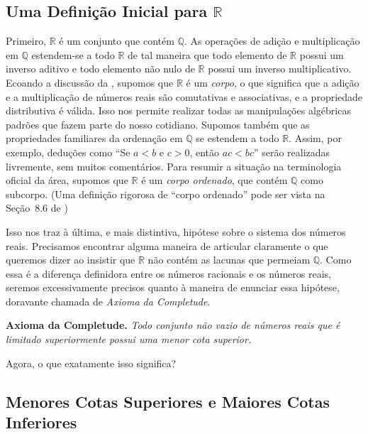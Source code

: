 \subsection{Uma Definição Inicial para $\mathbb{R}$}\label{subsec:definicao-inicial-R}

Primeiro, $\mathbb{R}$ é um conjunto que contém $\mathbb{Q}$. As operações de adição e multiplicação em $\mathbb{Q}$ estendem-se a todo $\mathbb{R}$ de tal maneira que todo elemento de $\mathbb{R}$ possui um inverso aditivo e todo elemento não nulo de $\mathbb{R}$ possui um inverso multiplicativo. Ecoando a discussão da , supomos que $\mathbb{R}$ é um \textit{corpo}, o que significa que a adição e a multiplicação de números reais são comutativas e associativas, e a propriedade distributiva é válida. Isso nos permite realizar todas as manipulações algébricas padrões que fazem parte do nosso cotidiano. Supomos também que as propriedades familiares da ordenação em $\mathbb{Q}$ se estendem a todo $\mathbb{R}$. Assim, por exemplo, deduções como ``Se $a < b$ e $c > 0$, então $ac < bc$'' serão realizadas livremente, sem muitos comentários. Para resumir a situação na terminologia oficial da área, supomos que $\mathbb{R}$ é um \textit{corpo ordenado}, que contém $\mathbb{Q}$ como subcorpo. (Uma definição rigorosa de ``corpo ordenado'' 
pode ser vista na Seção~8.6 de \cite{MR3331079})  

Isso nos traz à última, e mais distintiva, hipótese sobre o sistema dos números reais. Precisamos encontrar alguma maneira de articular claramente o que queremos dizer ao insistir que $\mathbb{R}$ não contém as lacunas que permeiam $\mathbb{Q}$. Como essa é a diferença definidora entre os números racionais e os números reais, seremos excessivamente precisos quanto à maneira de enunciar essa hipótese, doravante chamada de \textit{Axioma da Completude}. 

\bigskip 

 
\noindent\textbf{Axioma da Completude.} \textit{Todo conjunto não vazio de números reais que é limitado superiormente possui uma menor cota superior.}


\bigskip 


Agora, o que exatamente isso significa?

\subsection{Menores Cotas Superiores e Maiores Cotas Inferiores}\label{subsec:menores-cotas}

